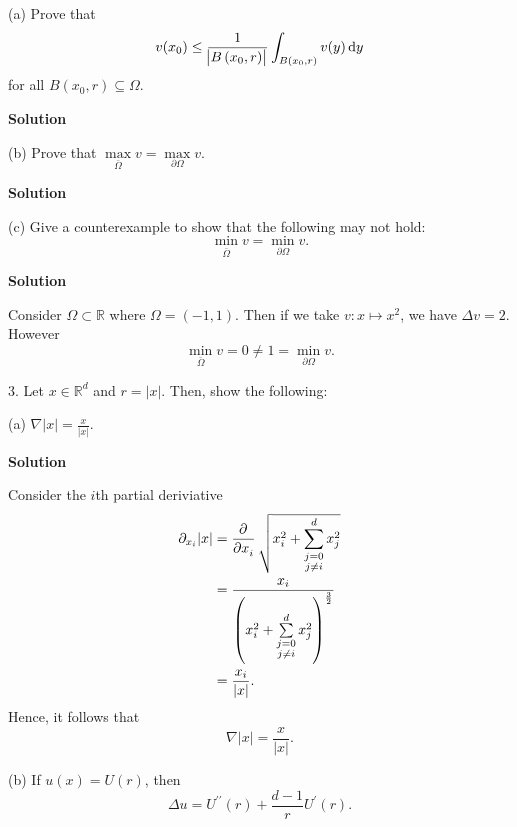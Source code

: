 \documentclass{article}
\begin{document}
(a) Prove that
%
\begin{equation*}
    v(x_0) \leq \frac{1}{\envert{B\del{x_0, r}}} \int_{B(x_0, r)} v(y) \dif y
\end{equation*}
%
for all $B(x_0, r) \subseteq \Omega$.

\textbf{Solution}

\vspace{5mm}

(b) Prove that $\max\limits_{\bar{\Omega}} v = \max\limits_{\partial \Omega} v$.

\textbf{Solution}

\vspace{5mm}

(c) Give a counterexample to show that the following may not hold:
%
\begin{equation*}
    \min_{\bar \Omega} v = \min_{\partial\Omega} v
    .
\end{equation*}

\textbf{Solution}

Consider $\Omega \subset \mathbb{R}$ where $\Omega = (-1, 1)$. Then if
we take $v: x \mapsto x^2$, we have $\Delta v = 2$. However
%
\begin{equation*}
    \min_{\bar \Omega} v = 0 \neq 1 = \min_{\partial\Omega} v
    .
\end{equation*}

\newpage

3. Let $x \in \mathbb{R}^d$ and $r = |x|$. Then, show the following:

(a) $\nabla |x| = \frac{x}{|x|}$.

\textbf{Solution}

Consider the $i$th partial deriviative
%
\begin{align*}
    \partial_{x_i} |x|
        &= \dpd{}{x_i} \sqrt{x_i^2 + \sum_{\substack{j = 0 \\ j \neq i}}^d x_j^2} \\
        &= \frac{x_i}{\del{x_i^2 + \sum\limits_{\substack{j = 0 \\ j \neq i}}^d x_j^2}^\frac{3}{2}} \\
        &= \frac{x_i}{|x|}
        .
\end{align*}
%
Hence, it follows that \[\nabla |x| = \frac{x}{|x|}.\]

\vspace{5mm}

(b) If $u(x) = U(r)$, then
%
\begin{equation*}
    \Delta u = U^{\prime \prime}(r) + \frac{d - 1}{r} U^\prime(r).
\end{equation*}
\end{document}
